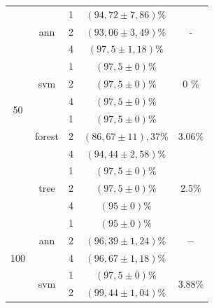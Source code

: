 \begin{table}[]
\begin{tabular}{|c|c|c|c|c|}
\multirow{12}{*}{50}  & \multirow{3}{*}{ann}    & 1                & $ (94,72 \pm 7,86) \% $   & \multirow{3}{*}{-} \\ \cline{3-4} 
                      &                         & 2                & $ (93,06 \pm 3,49) \% $  & \\ \cline{3-4} 
                      &                         & 4                & $ (97,5 \pm 1,18) \% $    &\\ \cline{2-5} 
                      & \multirow{3}{*}{svm}    & 1                & $ (97,5 \pm 0) \% $       & \multirow{3}{*}{0 \%} \\ \cline{3-4} 
                      &                         & 2                & $ (97,5 \pm 0) \% $     &  \\ \cline{3-4} 
                      &                         & 4                & $ (97,5 \pm 0) \% $       & \\ \cline{2-5} 
                      & \multirow{3}{*}{forest} & 1                & $ (97,5 \pm 0) \% $       & \multirow{3}{*}{3.06\%} \\ \cline{3-4} 
                      &                         & 2                & $ (86,67 \pm 11),37 \% $ & \\ \cline{3-4} 
                      &                         & 4                & $ (94,44 \pm 2,58) \% $   &\\ \cline{2-5} 
                      & \multirow{3}{*}{tree}   & 1                & $ (97,5 \pm 0) \% $       & \multirow{3}{*}{2.5\%} \\ \cline{3-4} 
                      &                         & 2                & $ (97,5 \pm 0) \% $      & \\ \cline{3-4} 
                      &                         & 4                & $ (95 \pm 0) \%   $      &\\ \hline
\multirow{12}{*}{100} & \multirow{3}{*}{ann}    & 1                & $ (95 \pm 0) \%   $      & \multirow{3}{*}{$-$} \\ \cline{3-4} 
                      &                         & 2                & $ (96,39 \pm 1,24) \% $   &\\ \cline{3-4} 
                      &                         & 4                & $ (96,67 \pm 1,18) \% $  & \\ \cline{2-5} 
                      & \multirow{3}{*}{svm}    & 1                & $ (97,5 \pm 0) \% $       & \multirow{3}{*}{3.88\%} \\ \cline{3-4} 
                      &                         & 2                & $ (99,44 \pm 1,04) \% $  & \\ \cline{3-4} 

\end{tabular}
\end{table}
